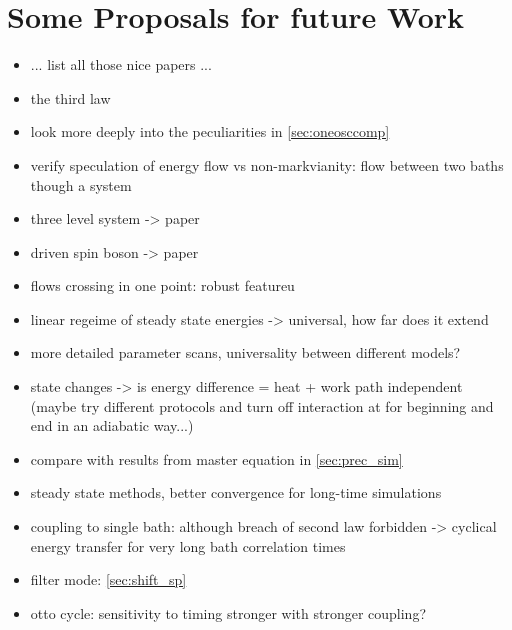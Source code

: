 \section{Some Proposals for future Work}
\begin{itemize}
\item ... list all those nice papers ...
\item the third law
\item look more deeply into the peculiarities in \cref{sec:oneosccomp}
\item verify speculation of energy flow vs non-markvianity: flow
  between two baths though a system
\item three level system -> paper
\item driven spin boson -> paper \cite{Magazzu2018Apr}
\item flows crossing in one point: robust featureu
\item linear regeime of steady state energies -> universal, how far
  does it extend
\item more detailed parameter scans, universality between different models?
\item state changes -> is energy difference = heat + work path
  independent (maybe try different protocols and turn off interaction
  at for beginning and end in an adiabatic way...)
\item compare with results from master equation in \cref{sec:prec_sim}
\item steady state methods, better convergence for long-time
  simulations
\item coupling to single bath: although breach of second law forbidden
  -> cyclical energy transfer for very long bath correlation times
\item filter mode: \cref{sec:shift_sp}
\item otto cycle: sensitivity to timing stronger with stronger coupling?
\end{itemize}
